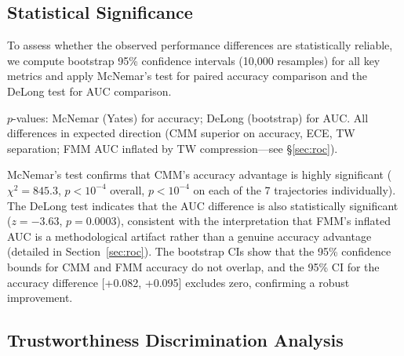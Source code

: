 \documentclass[letterpaper,journal]{IEEEtran}
\begin{document}
\subsection{Statistical Significance}

To assess whether the observed performance differences are statistically
reliable, we compute bootstrap 95\% confidence intervals (10,000 resamples) for
all key metrics and apply McNemar's test for paired accuracy comparison and the
DeLong test for AUC comparison.

\begin{table}[t]
\caption{Bootstrap 95\% CI and Hypothesis Tests (13,256 epochs)}
\label{tab:statistical}
\centering
{}
\smallskip
\par\noindent\footnotesize
$p$-values: McNemar (Yates) for accuracy; DeLong (bootstrap) for AUC. All differences in expected direction (CMM superior on accuracy, ECE, TW separation; FMM AUC inflated by TW compression---see \S\ref{sec:roc}).
\end{table}

McNemar's test confirms that CMM's accuracy advantage is highly significant
($\chi^2=845.3$, $p < 10^{-4}$ overall, $p < 10^{-4}$ on each of the 7
trajectories individually).  The DeLong test indicates that the AUC difference
is also statistically significant ($z = -3.63$, $p = 0.0003$), consistent with
the interpretation that FMM's inflated AUC is a methodological artifact rather
than a genuine accuracy advantage (detailed in Section~\ref{sec:roc}).  The
bootstrap CIs show that the 95\% confidence bounds for CMM and FMM accuracy do
not overlap, and the 95\% CI for the accuracy difference
[+0.082, +0.095] excludes zero, confirming a robust improvement.

\subsection{Trustworthiness Discrimination Analysis}
\label{sec:tw_discrimination}
\end{document}
